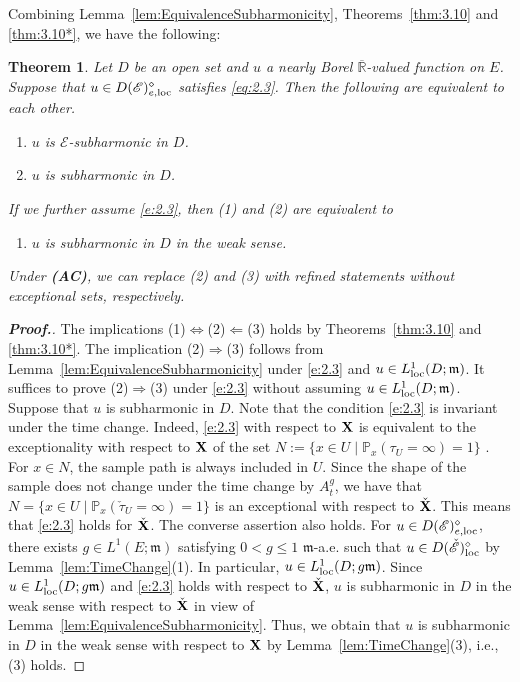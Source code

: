 \documentclass[12pt,a4paper]{article}
\newtheorem{thm}{Theorem}[section]
\newcommand{\R}{\mathbb{R}}
\newcommand{\m}{\mathfrak{m} }
\newcommand{\loc}{{\rm loc}}
\newcommand{\1}{{\bf 1}}
\begin{document}
Combining Lemma~\ref{lem:EquivalenceSubharmonicity}, Theorems~\ref{thm:3.10} and \ref{thm:3.10*}, 
we have the following: 
\begin{thm}\label{thm:main}
Let $D$ be an open set and $u$ a nearly Borel $\overline{\R}$-valued function on $E$. 
Suppose that $u\in D(\mathscr{E})_{e,\loc}^{\diamond}$ satisfies 
\eqref{eq:2.3}. Then the following are equivalent to each other.
\begin{enumerate}
\item[\rm(1)] $u$ is $\mathscr{E}$-subharmonic in $D$. 
\item[\rm(2)] $u$ is subharmonic in $D$.
\end{enumerate}
If we further assume \eqref{e:2.3}, 
 then {\rm(1)} and {\rm(2)} are equivalent to  
\begin{enumerate}
\item[\rm(3)] $u$ is subharmonic in $D$ in the weak sense.
\end{enumerate}
Under {\bf (AC)}, we can replace {\rm(2)} and {\rm(3)}  
with refined statements without exceptional sets, respectively. 
\end{thm}
\begin{proof}[\bf Proof.]
The implications (1)$\Longleftrightarrow$(2)$\Longleftarrow$(3) holds by 
Theorems~\ref{thm:3.10} and \ref{thm:3.10*}.  
The implication (2)$\Longrightarrow$(3) follows from Lemma~\ref{lem:EquivalenceSubharmonicity} under 
\eqref{e:2.3} and $u\in L^1_{\loc}(D;{\m})$. 
It suffices to prove (2)$\Longrightarrow$(3) 
under \eqref{e:2.3} 
without assuming $u\in L^1_{\loc}(D;{\m})$. 
Suppose that $u$ is subharmonic in $D$. 
Note that the condition 
\eqref{e:2.3} is invariant under the time change. 
Indeed,  \eqref{e:2.3} with respect to ${\bf X}$ 
is equivalent to the exceptionality with respect to ${\bf X}$ of 
the set $N:=\{x\in U\mid\mathbb{P}_x(\tau_U=\infty)=1\}$ . 
For $x\in N$, the sample path is always included in $U$. 
Since the shape of the sample does not change under the time change by 
$A_t^g$, we have that 
$N=\{x\in U\mid\mathbb{P}_x(\check{\tau}_U=\infty)=1\}$ is 
an exceptional with respect to $\check{\bf X}$. This means that \eqref{e:2.3} 
holds for $\check{\bf X}$.  The converse assertion also holds. 
For $u\in D(\mathscr{E})_{e,\loc}^{\diamond}$, there exists 
$g\in L^1(E;{\m})$ satisfying $0<g\leq1$ ${\m}$-a.e. such that 
$u\in D(\check{\mathscr{E}})_{\loc}^{\diamond}$ by Lemma~\ref{lem:TimeChange}(1). In particular, 
$u\in L^1_{\loc}(D;g{\m})$. Since $u\in L^1_{\loc}(D;g{\m})$ and \eqref{e:2.3}  holds with respect to $\check{\bf X}$, $u$ is subharmonic in $D$ in the weak sense 
with respect to $\check{\bf X}$ in view of Lemma~\ref{lem:EquivalenceSubharmonicity}.    
Thus, we obtain that $u$ is subharmonic in $D$ in the weak sense  
 with respect to ${\bf X}$ by  Lemma~\ref{lem:TimeChange}(3), i.e., 
 (3) holds. 
\end{proof}
\end{document}
